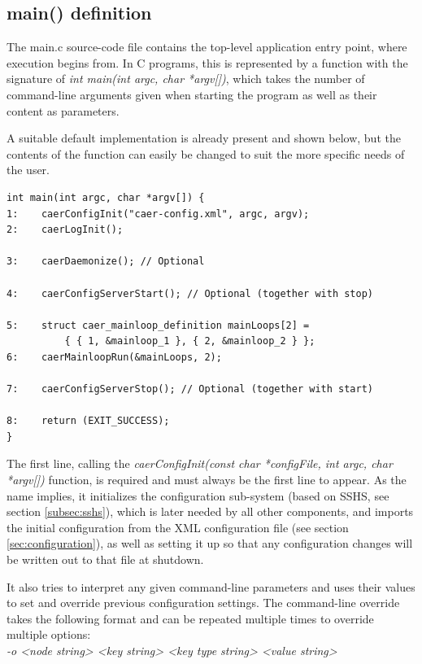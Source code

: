 \documentclass[a4paper,12pt]{report}
\begin{document}
\subsection{main() definition} \label{subsec:main_definition}

The main.c source-code file contains the top-level application entry point, where execution begins from.
In C programs, this is represented by a function with the signature of \emph{int main(int argc, char *argv[])}, which takes the number of command-line arguments given when starting the program as well as their content as parameters.

A suitable default implementation is already present and shown below, but the contents of the function can easily be changed to suit the more specific needs of the user.
\clearpage
\begin{lstlisting}
int main(int argc, char *argv[]) {
1:    caerConfigInit("caer-config.xml", argc, argv);
2:    caerLogInit();
    
3:    caerDaemonize(); // Optional
    
4:    caerConfigServerStart(); // Optional (together with stop)
    
5:    struct caer_mainloop_definition mainLoops[2] =
          { { 1, &mainloop_1 }, { 2, &mainloop_2 } };
6:    caerMainloopRun(&mainLoops, 2);
    
7:    caerConfigServerStop(); // Optional (together with start)
    
8:    return (EXIT_SUCCESS);
}
\end{lstlisting}

The first line, calling the \emph{caerConfigInit(const char *configFile, int argc, char *argv[])} function, is required and must always be the first line to appear. As the name implies, it initializes the configuration sub-system (based on SSHS, see section \ref{subsec:sshs}), which is later needed by all other components, and imports the initial configuration from the XML configuration file (see section \ref{sec:configuration}), as well as setting it up so that any configuration changes will be written out to that file at shutdown.

It also tries to interpret any given command-line parameters and uses their values to set and override previous configuration settings.
The command-line override takes the following format and can be repeated multiple times to override multiple options:
\\\emph{-o <node string> <key string> <key type string> <value string>}
\end{document}
